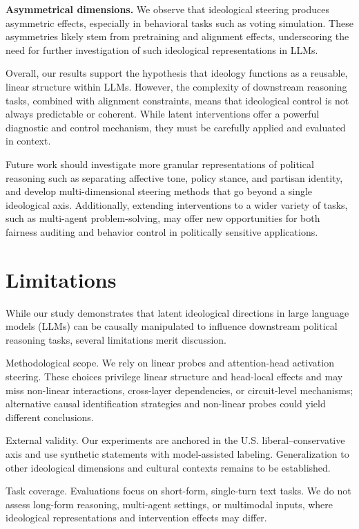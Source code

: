 \documentclass[11pt]{article}
\begin{document}
\textbf{Asymmetrical dimensions.} We observe that ideological steering produces asymmetric effects, especially in behavioral tasks such as voting simulation. These asymmetries likely stem from pretraining and alignment effects, underscoring the need for further investigation of such ideological representations in LLMs.

Overall, our results support the hypothesis that ideology functions as a reusable, linear structure within LLMs. However, the complexity of downstream reasoning tasks, combined with alignment constraints, means that ideological control is not always predictable or coherent. While latent interventions offer a powerful diagnostic and control mechanism, they must be carefully applied and evaluated in context.

Future work should investigate more granular  representations of political reasoning such as separating affective tone, policy stance, and partisan identity, and develop multi-dimensional steering methods that go beyond a single ideological axis. Additionally, extending interventions to a wider variety of tasks, such as multi-agent problem-solving, may offer new opportunities for both fairness auditing and behavior control in politically sensitive applications.

\section*{Limitations}

While our study demonstrates that latent ideological directions in large language models (LLMs) can be causally manipulated to influence downstream political reasoning tasks, several limitations merit discussion.

Methodological scope. We rely on linear probes and attention-head activation steering. These choices privilege linear structure and head-local effects and may miss non-linear interactions, cross-layer dependencies, or circuit-level mechanisms; alternative causal identification strategies and non-linear probes could yield different conclusions.

External validity. Our experiments are anchored in the U.S. liberal--conservative axis and use synthetic statements with model-assisted labeling. Generalization to other ideological dimensions and cultural contexts remains to be established.

Task coverage. Evaluations focus on short-form, single-turn text tasks. We do not assess long-form reasoning, multi-agent settings, or multimodal inputs, where ideological representations and intervention effects may differ.
\end{document}
